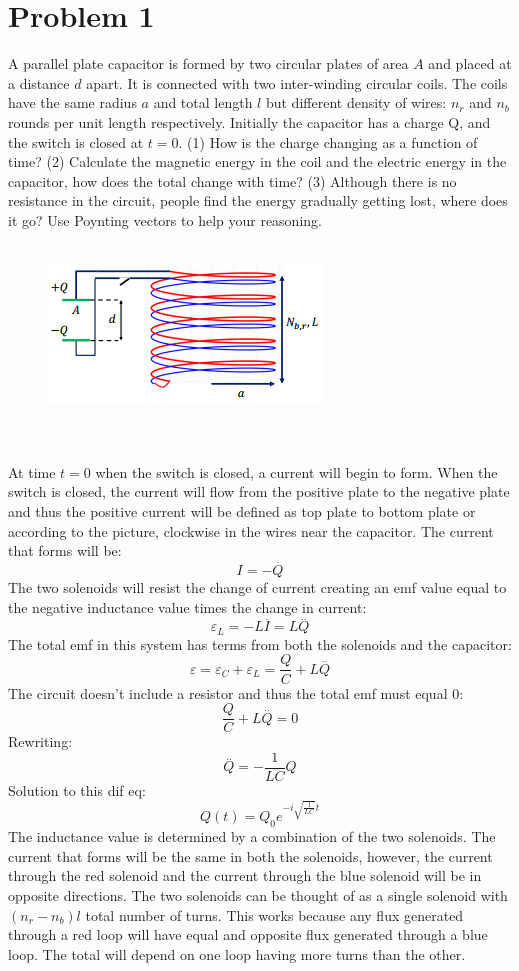 \documentclass[a4paper,12pt]{article}
\newcommand{\F}[2]{\ensuremath{\frac{#1}{#2}}}
\newcommand{\acc}[1]{\overset{..}{#1}}
\newcommand{\vel}[1]{\overset{.}{#1}}
\begin{document}
\section*{Problem 1}
A parallel plate capacitor is formed by two circular plates of area $A$ and placed at a distance $d$ apart. It is connected with two inter-winding circular coils. The coils have the same radius $a$ and total length $l$ but different density of wires: $n_r$ and $n_b$ rounds per unit length respectively.  Initially the capacitor has a charge Q, and the switch is closed at $t=0$. (1) How is the charge changing as a function of time? (2) Calculate the magnetic energy in the coil and the electric energy in the capacitor, how does the total change with time?  (3) Although there is no resistance in the circuit, people find the energy gradually getting lost, where does it go?  Use Poynting vectors to help your reasoning.\\ \\
\begin{figure}[h]
\centering
\includegraphics{Capacitor_Coil.png}
\end{figure}\\ \\
At time $t=0$ when the switch is closed, a current will begin to form.  When the switch is closed, the current will flow from the positive plate to the negative plate  and thus the positive current will be defined as top plate to bottom plate or according to the picture, clockwise in the wires near the capacitor.  The current that forms will be:
\[I=-\vel{Q}\]
The two solenoids will resist the change of current creating an emf value equal to the negative inductance value times the change in current:
\[\varepsilon_L=-L\vel{I}=L\acc{Q}\]
The total emf in this system has terms from both the solenoids and the capacitor:
\[\varepsilon=\varepsilon_C+\varepsilon_L=\F{Q}{C}+L\acc{Q}\]
The circuit doesn't include a resistor and thus the total emf must equal 0:
\[\F{Q}{C}+L\acc{Q}=0\]
Rewriting:
\[\acc{Q}=-\F{1}{LC}Q\]
Solution to this dif eq:
\[Q(t)=Q_0e^{-i\sqrt{\F{1}{LC}}t}\]
The inductance value is determined by a combination of the two solenoids. The current that forms will be the same in both the solenoids, however, the current through the red solenoid and the current through the blue solenoid will be in opposite directions.  The two solenoids can be thought of as a single solenoid with $(n_r-n_b)l$ total number of turns.  This works because any flux generated through a red loop will have equal and opposite flux generated through a blue loop.  The total will depend on one loop having more turns than the other.  \\
\end{document}
